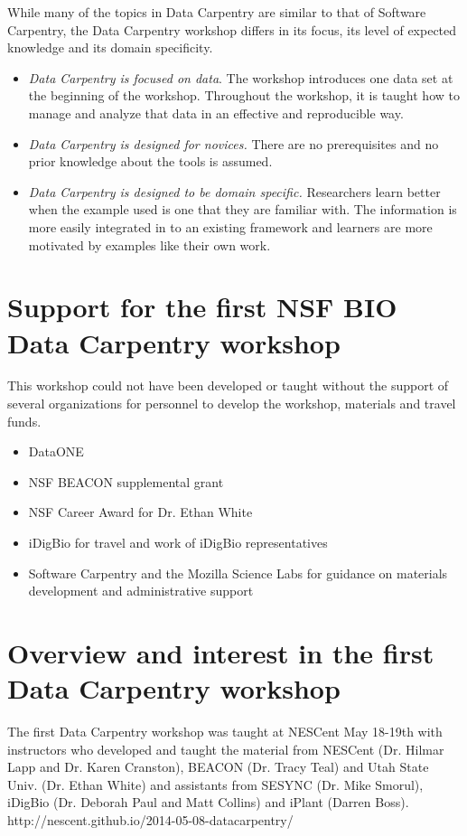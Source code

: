 \documentclass[11pt]{article}
\begin{document}
While many of the topics in Data Carpentry are similar to that of Software Carpentry, the Data Carpentry 
workshop differs in its focus, its level of expected knowledge and its domain specificity.
\begin{itemize}
\item \emph{Data Carpentry is focused on data}. The workshop introduces one data set at the beginning of the
workshop. Throughout the workshop, it is taught how to manage and analyze that data in an effective and reproducible 
way.
\item \emph{Data Carpentry is designed for novices.} There are no prerequisites and no 
prior knowledge about the tools is assumed.
\item \emph{Data Carpentry is designed to be domain specific.} Researchers learn better when the example used is
one that they are familiar with. The information is more easily integrated in to an existing framework and learners 
are more motivated by examples like their own work.
\end{itemize}

\section{Support for the first NSF BIO Data Carpentry workshop}
This workshop could not have been developed or taught without the support of several organizations for personnel to develop the workshop, materials and travel funds.
\begin{itemize}
\item{DataONE}
\item{NSF BEACON supplemental grant}
\item{NSF Career Award for Dr. Ethan White}
\item{iDigBio for travel and work of iDigBio representatives}
\item{Software Carpentry and the Mozilla Science Labs for guidance on materials development and administrative support}
\end{itemize}

\section{Overview and interest in the first Data Carpentry workshop}

The first Data Carpentry workshop was taught at NESCent May 18-19th with instructors who developed and taught the material from NESCent (Dr. Hilmar Lapp and Dr. Karen Cranston), BEACON (Dr. Tracy Teal) and Utah State Univ. (Dr. Ethan White) and assistants from SESYNC (Dr. Mike Smorul), iDigBio (Dr. Deborah Paul and Matt Collins) and iPlant (Darren Boss).
\\http://nescent.github.io/2014-05-08-datacarpentry/
\end{document}
